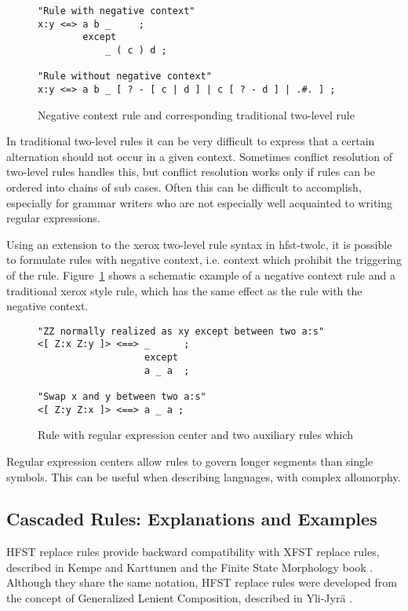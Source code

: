 \documentclass{llncs}
\begin{document}
\begin{figure}
\begin{verbatim}
"Rule with negative context"
x:y <=> a b _     ;
        except
            _ ( c ) d ;

"Rule without negative context"
x:y <=> a b _ [ ? - [ c | d ] | c [ ? - d ] | .#. ] ;
\end{verbatim}
\caption{Negative context rule and corresponding traditional two-level
  rule}\label{negative-context-rule}
\end{figure}

In traditional two-level rules it can be very difficult to express
that a certain alternation should not occur in a given
context. Sometimes conflict resolution of two-level rules handles
this, but conflict resolution works only if rules can be ordered into
chains of sub cases. Often this can be difficult to accomplish,
especially for grammar writers who are not especially well acquainted
to writing regular expressions.

Using an extension to the xerox two-level rule syntax in hfst-twolc,
it is possible to formulate rules with negative context, i.e. context
which prohibit the triggering of the
rule. Figure~\ref{negative-context-rule} shows a schematic example of
a negative context rule and a traditional xerox style rule, which has
the same effect as the rule with the negative context.

\begin{figure}
\begin{verbatim}
"ZZ normally realized as xy except between two a:s"
<[ Z:x Z:y ]> <==> _      ;
                   except
                   a _ a  ;

"Swap x and y between two a:s"
<[ Z:y Z:x ]> <==> a _ a ; 
\end{verbatim}
\caption{Rule with regular expression center and two auxiliary rules which}
\end{figure}

Regular expression centers allow rules to govern longer segments than
single symbols. This can be useful when describing languages, with
complex allomorphy.

\subsection{Cascaded Rules: Explanations and Examples}
HFST replace rules provide backward compatibility with XFST replace rules, described in Kempe and Karttunen \cite{Kempe96parallelreplacement} and the Finite State Morphology book \cite{beesley/2003}. Although they share the same notation, HFST replace rules were developed from the concept of Generalized Lenient Composition, described in Yli-Jyr\"{a} \cite{YliJyra/2008b}. 
\end{document}
